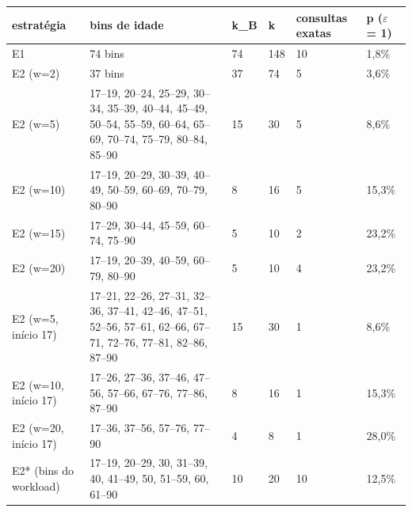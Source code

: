\begin{tabular}{llllll}
\toprule
estratégia & bins de idade & k\_B & k & consultas exatas & p ($\varepsilon$ = 1) \\
\midrule
E1 & 74 bins & 74 & 148 & 10 & 1,8\% \\
E2 (w=2) & 37 bins & 37 & 74 & 5 & 3,6\% \\
E2 (w=5) & 17–19, 20–24, 25–29, 30–34, 35–39, 40–44, 45–49, 50–54, 55–59, 60–64, 65–69, 70–74, 75–79, 80–84, 85–90 & 15 & 30 & 5 & 8,6\% \\
E2 (w=10) & 17–19, 20–29, 30–39, 40–49, 50–59, 60–69, 70–79, 80–90 & 8 & 16 & 5 & 15,3\% \\
E2 (w=15) & 17–29, 30–44, 45–59, 60–74, 75–90 & 5 & 10 & 2 & 23,2\% \\
E2 (w=20) & 17–19, 20–39, 40–59, 60–79, 80–90 & 5 & 10 & 4 & 23,2\% \\
E2 (w=5, início 17) & 17–21, 22–26, 27–31, 32–36, 37–41, 42–46, 47–51, 52–56, 57–61, 62–66, 67–71, 72–76, 77–81, 82–86, 87–90 & 15 & 30 & 1 & 8,6\% \\
E2 (w=10, início 17) & 17–26, 27–36, 37–46, 47–56, 57–66, 67–76, 77–86, 87–90 & 8 & 16 & 1 & 15,3\% \\
E2 (w=20, início 17) & 17–36, 37–56, 57–76, 77–90 & 4 & 8 & 1 & 28,0\% \\
E2* (bins do workload) & 17–19, 20–29, 30, 31–39, 40, 41–49, 50, 51–59, 60, 61–90 & 10 & 20 & 10 & 12,5\% \\
\bottomrule
\end{tabular}
